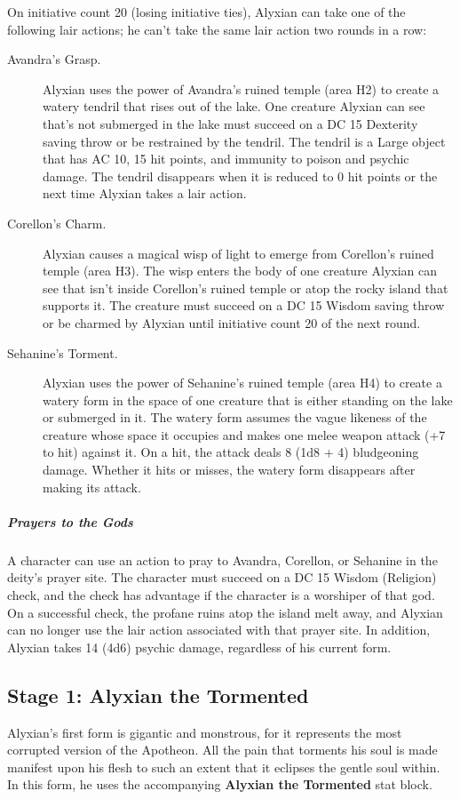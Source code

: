 \documentclass[10pt,a4paper,twoside,fancy,bg=print,twocolumn,openany,nodeprecatedcode]{dndbook}
\begin{document}
On initiative count 20 (losing initiative ties), Alyxian can take one of the following lair actions; he can't take the same lair action two rounds in a row:


\begin{description}
\item[Avandra's Grasp.]
Alyxian uses the power of Avandra's ruined temple (area H2) to create a watery tendril that rises out of the lake. One creature Alyxian can see that's not submerged in the lake must succeed on a DC 15 Dexterity saving throw or be restrained by the tendril. The tendril is a Large object that has AC 10, 15 hit points, and immunity to poison and psychic damage. The tendril disappears when it is reduced to 0 hit points or the next time Alyxian takes a lair action.
\item[Corellon's Charm.]
Alyxian causes a magical wisp of light to emerge from Corellon's ruined temple (area H3). The wisp enters the body of one creature Alyxian can see that isn't inside Corellon's ruined temple or atop the rocky island that supports it. The creature must succeed on a DC 15 Wisdom saving throw or be charmed by Alyxian until initiative count 20 of the next round.
\item[Sehanine's Torment.]
Alyxian uses the power of Sehanine's ruined temple (area H4) to create a watery form in the space of one creature that is either standing on the lake or submerged in it. The watery form assumes the vague likeness of the creature whose space it occupies and makes one melee weapon attack (+7 to hit) against it. On a hit, the attack deals 8 (1d8 + 4) bludgeoning damage. Whether it hits or misses, the watery form disappears after making its attack.
\end{description}

\subparagraph{Prayers to the Gods}
A character can use an action to pray to Avandra, Corellon, or Sehanine in the deity's prayer site. The character must succeed on a DC 15 Wisdom (Religion) check, and the check has advantage if the character is a worshiper of that god. On a successful check, the profane ruins atop the island melt away, and Alyxian can no longer use the lair action associated with that prayer site. In addition, Alyxian takes 14 (4d6) psychic damage, regardless of his current form.

\subsection{Stage 1: Alyxian the Tormented}
Alyxian's first form is gigantic and monstrous, for it represents the most corrupted version of the Apotheon. All the pain that torments his soul is made manifest upon his flesh to such an extent that it eclipses the gentle soul within. In this form, he uses the accompanying \textbf{Alyxian the Tormented} stat block.
\end{document}
